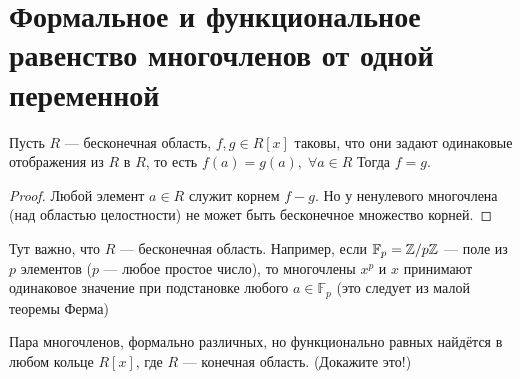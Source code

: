 \section{Формальное и функциональное равенство многочленов от одной переменной}

\begin{theorem-non}
    Пусть $R$ --- бесконечная область, $f,g \in R[x]$ таковы,
    что они задают одинаковые отображения из $R$ в $R$, то есть
    $f(a) = g(a),\; \forall a \in R$
    Тогда $f = g$. 
\end{theorem-non}

\begin{proof}
    Любой элемент $a \in R$ служит корнем $f - g$.
    Но у ненулевого многочлена (над областью целостности) не может
    быть бесконечное множество корней. 
\end{proof}

\notice 
Тут важно, что $R$ --- бесконечная область. Например, если
$\mathbb{F}_p = \mathbb{Z} /p\mathbb{Z}$ --- поле из $p$ элементов ($p$ --- любое простое число), то
многочлены $x^p$ и $x$ принимают одинаковое значение при подстановке любого $a \in \mathbb{F}_p$ (это следует из малой теоремы Ферма)

Пара многочленов, формально различных, но функционально равных найдётся в любом кольце $R[x]$, где $R$ --- конечная область. (Докажите это!)
